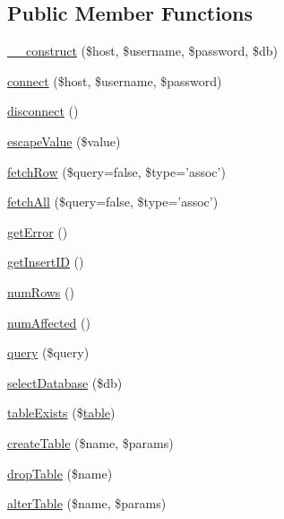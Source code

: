 \subsection*{Public Member Functions}
\begin{DoxyCompactItemize}
\item 
\hyperlink{interfacedatabase_adapter_a81fcddb424f13e0862ee3f7e1ea57ce9}{\_\-\_\-construct} (\$host, \$username, \$password, \$db)
\item 
\hyperlink{interfacedatabase_adapter_a4c4f3316747e665b9e02f6ddcba4117c}{connect} (\$host, \$username, \$password)
\item 
\hyperlink{interfacedatabase_adapter_abe175fcf658475bc56e9d6fa02bc88ec}{disconnect} ()
\item 
\hyperlink{interfacedatabase_adapter_a039ae2e8f2bf579fd75d9df8df87eee3}{escapeValue} (\$value)
\item 
\hyperlink{interfacedatabase_adapter_a529385852efa66f19288496930ee5394}{fetchRow} (\$query=false, \$type='assoc')
\item 
\hyperlink{interfacedatabase_adapter_a861f65695740a1d866ce1001f0ae706d}{fetchAll} (\$query=false, \$type='assoc')
\item 
\hyperlink{interfacedatabase_adapter_a24ada5decce3d1b79cd82f5a90ccf404}{getError} ()
\item 
\hyperlink{interfacedatabase_adapter_ac73f1d8cddbdfc35ca442189378a073c}{getInsertID} ()
\item 
\hyperlink{interfacedatabase_adapter_af37433a300db1f607ee789d22828a0a0}{numRows} ()
\item 
\hyperlink{interfacedatabase_adapter_acac8dfe61e7840f9a1e672ebede0be21}{numAffected} ()
\item 
\hyperlink{interfacedatabase_adapter_ac9fddec3f6bd1db128887a1b211d90f0}{query} (\$query)
\item 
\hyperlink{interfacedatabase_adapter_ab624b0b234f9db9dbc6dc4180f566b1f}{selectDatabase} (\$db)
\item 
\hyperlink{interfacedatabase_adapter_ae7cdaa744d52a1eb0103e377023ca528}{tableExists} (\$\hyperlink{classtable}{table})
\item 
\hyperlink{interfacedatabase_adapter_a4b06dfe3bf7dd552f828a80fece817d8}{createTable} (\$name, \$params)
\item 
\hyperlink{interfacedatabase_adapter_a3471d37afdd3d76f5379dfe7364db0b6}{dropTable} (\$name)
\item 
\hyperlink{interfacedatabase_adapter_aa8cf3e2be109e548bed6980622fffb41}{alterTable} (\$name, \$params)
\end{DoxyCompactItemize}


